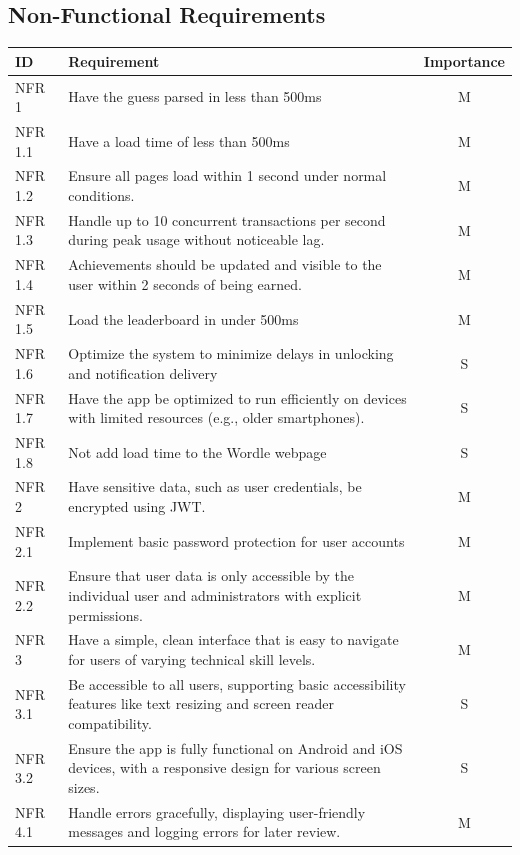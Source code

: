 \subsection{Non-Functional Requirements}
\begin{tabularx}{\textwidth}{|l|X|c|}
\hline
\textbf{ID} & \textbf{Requirement} & \textbf{Importance} \\
\hline
NFR 1 & Have the guess parsed in less than 500ms & M \\
\hline
NFR 1.1 & Have a load time of less than 500ms & M \\
\hline
NFR 1.2 & Ensure all pages load within 1 second under normal conditions. & M \\
\hline
NFR 1.3 & Handle up to 10 concurrent transactions per second during peak usage without noticeable lag. & M \\
\hline
NFR 1.4 & Achievements should be updated and visible to the user within 2 seconds of being earned. & M \\
\hline
NFR 1.5 & Load the leaderboard in under 500ms & M \\
\hline
NFR 1.6 & Optimize the system to minimize delays in unlocking and notification delivery & S \\
\hline
NFR 1.7 & Have the app be optimized to run efficiently on devices with limited resources (e.g., older smartphones). & S \\
\hline
NFR 1.8 & Not add load time to the Wordle webpage & S \\
\hline
NFR 2 & Have sensitive data, such as user credentials, be encrypted using JWT. & M \\
\hline
NFR 2.1 & Implement basic password protection for user accounts & M \\
\hline
NFR 2.2 & Ensure that user data is only accessible by the individual user and administrators with explicit permissions. & M \\
\hline
NFR 3 & Have a simple, clean interface that is easy to navigate for users of varying technical skill levels. & M \\
\hline
NFR 3.1 & Be accessible to all users, supporting basic accessibility features like text resizing and screen reader compatibility. & S \\
\hline
NFR 3.2 & Ensure the app is fully functional on Android and iOS devices, with a responsive design for various screen sizes. & S \\
\hline
NFR 4.1 & Handle errors gracefully, displaying user-friendly messages and logging errors for later review. & M \\

\end{tabularx}
